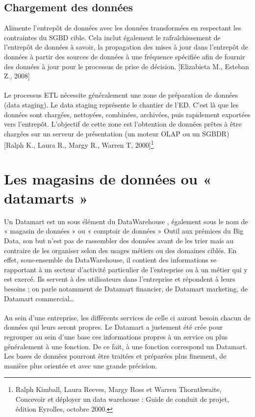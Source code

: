 \subsection{Chargement des données}
Alimente l’entrepôt de données avec les données transformées en respectant les contraintes du SGBD cible. Cela inclut également le rafraîchissement de l’entrepôt de données à savoir, la propagation des mises à jour dans l’entrepôt de données à partir des sources de données à une fréquence spécifiée afin de fournir des données à jour pour le processus de prise de décision. [Elizabieta M., Esteban Z., 2008]

\paragraph{}
Le processus ETL nécessite généralement une zone de préparation de données (data staging). Le data staging représente le chantier de l’ED. C’est là que les données sont chargées, nettoyées, combinées, archivées, puis rapidement exportées vers l’entrepôt. L’objectif de cette zone est l’obtention de données prêtes à être chargées sur un serveur de présentation (un moteur OLAP ou un SGBDR) [Ralph K., Laura R., Margy R., Warren T, 2000]\footnote{Ralph Kimball, Laura Reeves, Margy Ross et Warren Thornthwaite, Concevoir et déployer un data warehouse : Guide de conduit de projet, édition Eyrolles, octobre 2000.}



\section{Les magasins de données ou « datamarts »}
Un Datamart est un sous élément du DataWarehouse , également sous le nom de « magasin de données » ou « comptoir de données » Outil aux prémices du Big Data, son but n’est pas de rassembler des données avant de les trier mais au contraire de les organiser selon des usages métiers ou des domaines ciblés. En effet, sous-ensemble du DataWarehouse, il contient des informations se rapportant à un secteur d'activité particulier de l'entreprise ou à un métier qui y est exercé. Ils servent à des utilisateurs dans l’entreprise et répondent à leurs besoins ; on parle notamment de Datamart financier, de Datamart marketing, de Datamart commercial…
\paragraph{}
Au sein d’une entreprise, les différents services de celle ci auront besoin chacun de données qui leurs seront propres. Le Datamart a justement été crée pour regrouper au sein d’une base ces informations propres à un service ou plus généralement à une fonction. De ce fait, à une fonction correspond un Datamart. Les bases de données pourront être traitées et préparées plus finement, de manière plus orientée et avec une grande précision.
